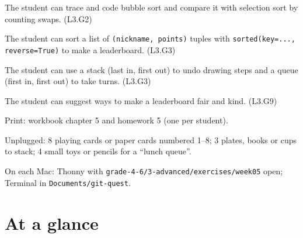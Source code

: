 
\begin{objectives}
  \item The student can trace and code bubble sort and compare it with selection sort by counting swaps. (L3.G2)
  \item The student can sort a list of \texttt{(nickname, points)} tuples with \texttt{sorted(key=..., reverse=True)} to make a leaderboard. (L3.G3)
  \item The student can use a stack (last in, first out) to undo drawing steps and a queue (first in, first out) to take turns. (L3.G3)
  \item The student can suggest ways to make a leaderboard fair and kind. (L3.G9)
\end{objectives}

\begin{materials}
  \item Print: workbook chapter 5 and homework 5 (one per student).
  \item Unplugged: 8 playing cards or paper cards numbered 1--8; 3 plates, books or cups to stack; 4 small toys or pencils for a \enquote{lunch queue}.
  \item On each Mac: Thonny with \texttt{grade-4-6/3-advanced/exercises/week05} open; Terminal in \texttt{Documents/git-quest}.
\end{materials}

\section{At a glance}
\begin{timeplan}
\end{timeplan}

